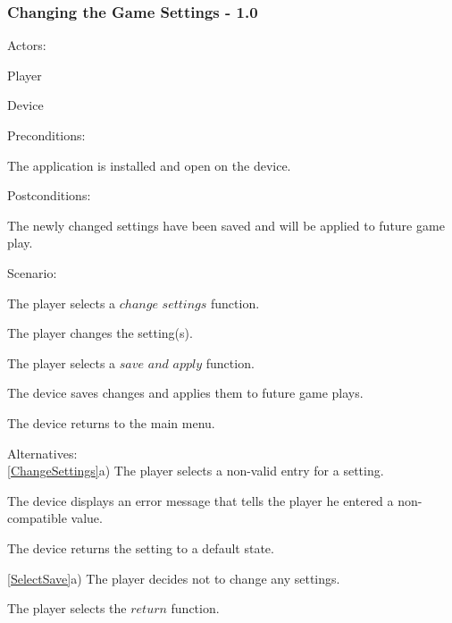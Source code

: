 \documentclass[12pt]{article}
\newenvironment{itemize*}%
  {\begin{itemize}%
  	\setlength{\parsep}{0pt}
    \setlength{\itemsep}{0pt}%
    \setlength{\parskip}{0pt}}%
  {\end{itemize}}
\newenvironment{enumerate*}%
  {\begin{enumerate}%
  	\setlength{\parsep}{0pt}
    \setlength{\itemsep}{0pt}%
    \setlength{\parskip}{0pt}}%
  {\end{enumerate}}
\begin{document}
\subsubsection*{Changing the Game Settings - 1.0}
Actors:
\begin{itemize*}
\item Player
\item Device
\end{itemize*}
Preconditions:
\begin{itemize*}
\item The application is installed and open on the device.
\end{itemize*}
Postconditions:
\begin{itemize*}
\item The newly changed settings have been saved and will be applied to future game play.
\end{itemize*}
Scenario:
\begin{enumerate*}
\item \label{SelectChangeSettings}The player selects a $change$ $settings$ function.
\item \label{ChangeSettings}The player changes the setting(s).
\item \label{SelectSave}The player selects a $save$ $and$ $apply$ function.
\item \label{SystemSaves}The device saves changes and applies them to future game plays.
\item \label{ReturnToMainMenu}The device returns to the main menu.
\end{enumerate*}
Alternatives:\\
\ref{ChangeSettings}a) The player selects a non-valid entry for a setting.
\begin{enumerate*}
\item The device displays an error message that tells the player he entered a non-compatible value.
\item The device returns the setting to a default state.
\end{enumerate*}
\ref{SelectSave}a) The player decides not to change any settings.
\begin{enumerate*}
\item The player selects the $return$ function.
\end{enumerate*}
\onehalfspacing

\singlespacing
\end{document}

